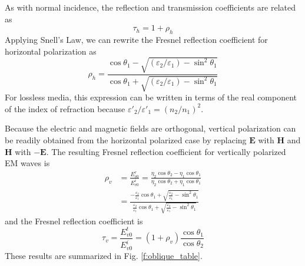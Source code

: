 \documentclass[11pt, oneside]{article}
\begin{document}
As with normal incidence, the reflection and transmission coefficients are related as
	\begin{equation}
	\tau_h = 1 + \rho_h
	\end{equation}
Applying Snell's Law, we can rewrite the Fresnel reflection coefficient for horizontal polarization as
	\begin{equation}
	\rho_h = \frac{\cos{\theta_1} - \sqrt{\left(\varepsilon_2/\varepsilon_1\right) - \sin^2{\theta_1}}}{
			\cos{\theta_1} + \sqrt{\left(\varepsilon_2/\varepsilon_1\right) - \sin^2{\theta_1}}}
	\end{equation}
For lossless media, this expression can be written in terms of the real component of the index of refraction because $\varepsilon'_2/\varepsilon'_1 = (n_2/n_1)^2$. 

Because the electric and magnetic fields are orthogonal, vertical polarization can be readily obtained from the horizontal polarized case by replacing $\mathbf{E}$ with $\mathbf{H}$ and $\mathbf{H}$ with $-\mathbf{E}$. The resulting Fresnel reflection coefficient for vertically polarized EM waves is
	\begin{subequations}
	\label{e:oblique_fresnel_vr1}
	\begin{align}
	\rho_v &= \frac{E_{v0}^r}{E_{v0}^i} = \frac{\eta_2\cos{\theta_2} - \eta_1\cos{\theta_1}}{\eta_2\cos{\theta_2} + \eta_1\cos{\theta_1}} \\
		&= \frac{\displaystyle - \frac{\varepsilon_2}{\varepsilon_1}\cos{\theta_1} + \sqrt{\frac{\varepsilon_2}{\varepsilon_1} - \sin^2{\theta_1}}}
			{\displaystyle \frac{\varepsilon_2}{\varepsilon_1}\cos{\theta_1} + \sqrt{\frac{\varepsilon_2}{\varepsilon_1} - \sin^2{\theta_1}}}
	\end{align}
	\end{subequations} 
and the Fresnel reflection coefficient is
	\begin{equation}
	\tau_v = \frac{E_{v0}^t}{E_{v0}^i} = \left(1 + \rho_v\right)\frac{\cos{\theta_1}}{\cos{\theta_2}}
	\end{equation}
These results are summarized in Fig. \ref{f:oblique_table}. 
\end{document}
